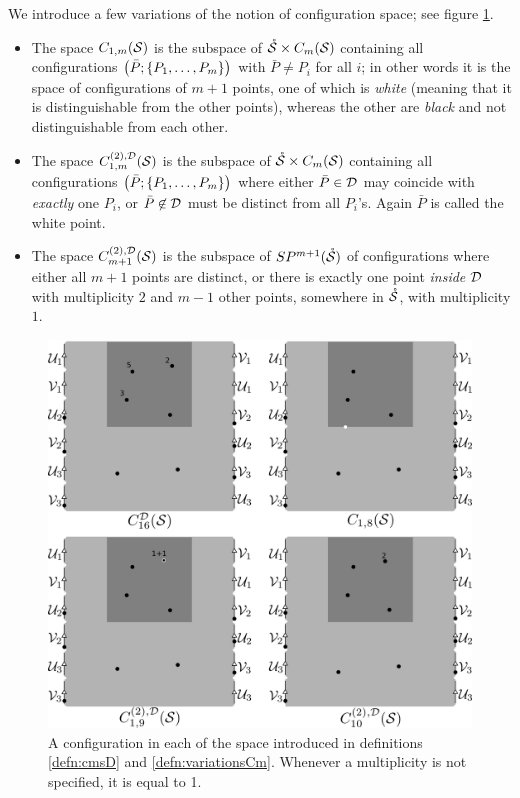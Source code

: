 \begin{defn}
\label{defn:variationsCm}
We introduce a few variations of the notion of configuration space; see figure \ref{fig:defcmsD}.
\begin{itemize} 
 \item The space $C_{1,m}(\S)$ is the subspace of $\mrS\times \cms$ containing all configurations
 $\pa{\bar P;\set{P_1,\dots,P_m}}$ with $\bar P\neq P_i$ for all $i$; in other words it is
 the space of configurations of $m+1$ points, one of which is \emph{white} (meaning that
 it is distinguishable from the other points), whereas the other are \emph{black} and not distinguishable
 from each other.
 \item The space $\fmstwoD$ is the subspace of $\mrS\times\cms$ containing all configurations
 $\pa{\bar P;\set{P_1,\dots, P_m}}$ where either $\bar P\in\D$ may coincide with \emph{exactly}
 one $P_i$, or
 $\bar P\not\in \D$ must be distinct from all $P_i$'s.
 Again $\bar P$ is called the white point.
 \item The space $\cmstwoD$ is the subspace of $\SP^{m+1}(\mrS)$ of configurations where either all $m+1$ points
 are distinct, or there is exactly one point \emph{inside $\D$} with multiplicity $2$ and $m-1$ other points,
 somewhere in $\mrS$, with multiplicity $1$.
\end{itemize}
 \end{defn}
 
\begin{figure}\centering
 \includegraphics{figures/defcmsD.png}
 \caption{A configuration in each of the space introduced in definitions \ref{defn:cmsD} and \ref{defn:variationsCm}.
 Whenever a multiplicity is not specified, it is equal to 1.}
\label{fig:defcmsD}
\end{figure}

